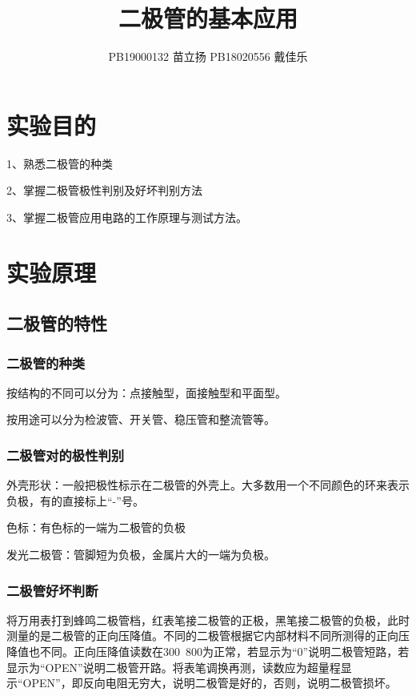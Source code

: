 \documentclass[a4paper,11pt,UTF8]{ctexart}
\title{二极管的基本应用}
\author{PB19000132 苗立扬  PB18020556 戴佳乐}
\begin{document}
\maketitle
	
	
	\newcommand\mr[1]{\mathrm{#1}}
	\newcommand\dd{\mathrm{d\,}}
	
	\section{实验目的}
	
	1、熟悉二极管的种类
	
	2、掌握二极管极性判别及好坏判别方法
	
	3、掌握二极管应用电路的工作原理与测试方法。
	
	\section{实验原理}
	
	\subsection{二极管的特性}
	\subsubsection{二极管的种类}
	按结构的不同可以分为：点接触型，面接触型和平面型。
	
	
	按用途可以分为检波管、开关管、稳压管和整流管等。
	\subsubsection{二极管对的极性判别}
	外壳形状：一般把极性标示在二极管的外壳上。大多数用一个不同颜色的环来表示负极，有的直接标上“-”号。
	
	
	色标：有色标的一端为二极管的负极
	
	
	发光二极管：管脚短为负极，金属片大的一端为负极。
	\subsubsection{二极管好坏判断}
	将万用表打到蜂鸣二极管档，红表笔接二极管的正极，黑笔接二极管的负极，此时测量的是二极管的正向压降值。不同的二极管根据它内部材料不同所测得的正向压降值也不同。正向压降值读数在300~800为正常，若显示为“0”说明二极管短路，若显示为“OPEN”说明二极管开路。将表笔调换再测，读数应为超量程显示“OPEN”，即反向电阻无穷大，说明二极管是好的，否则，说明二极管损坏。
	
\end{document}

